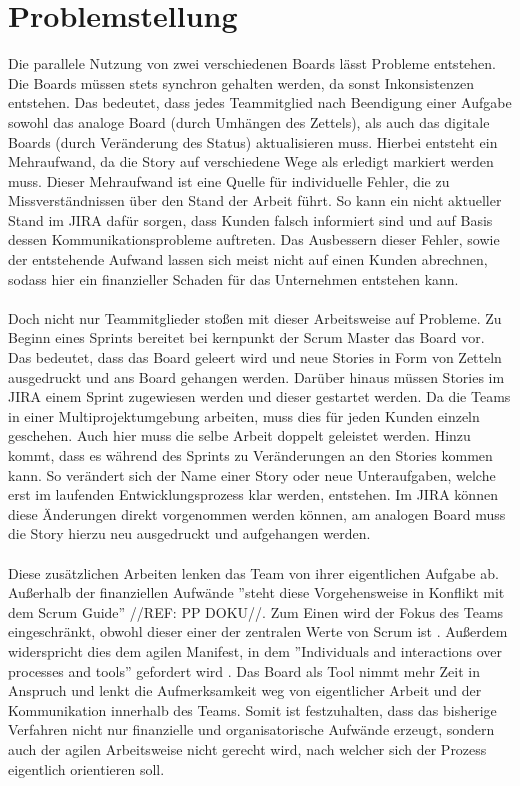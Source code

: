 \section{Problemstellung}
\label{sec:problemstellung}
Die parallele Nutzung von zwei verschiedenen Boards lässt Probleme entstehen. Die Boards müssen stets synchron gehalten werden, da sonst Inkonsistenzen entstehen. Das bedeutet, dass jedes Teammitglied nach Beendigung einer Aufgabe sowohl das analoge Board (durch Umhängen des Zettels), als auch das digitale Boards (durch Veränderung des Status) aktualisieren muss. Hierbei entsteht ein Mehraufwand, da die Story auf verschiedene Wege als erledigt markiert werden muss. Dieser Mehraufwand ist eine Quelle für individuelle Fehler, die zu Missverständnissen über den Stand der Arbeit führt. So kann ein nicht aktueller Stand im JIRA dafür sorgen, dass Kunden falsch informiert sind und auf Basis dessen Kommunikationsprobleme auftreten. Das Ausbessern dieser Fehler, sowie der entstehende Aufwand lassen sich meist nicht auf einen Kunden abrechnen, sodass hier ein finanzieller Schaden für das Unternehmen entstehen kann. \\
\\
Doch nicht nur Teammitglieder stoßen mit dieser Arbeitsweise auf Probleme. Zu Beginn eines Sprints bereitet bei kernpunkt der Scrum Master das Board vor. Das bedeutet, dass das Board geleert wird und neue Stories in Form von Zetteln ausgedruckt und ans Board gehangen werden. Darüber hinaus müssen Stories im JIRA einem Sprint zugewiesen werden und dieser gestartet werden. Da die Teams in einer Multiprojektumgebung arbeiten, muss dies für jeden Kunden einzeln geschehen. Auch hier muss die selbe Arbeit doppelt geleistet werden. Hinzu kommt, dass es während des Sprints zu Veränderungen an den Stories kommen kann. So verändert sich der Name einer Story oder neue Unteraufgaben, welche erst im laufenden Entwicklungsprozess klar werden, entstehen. Im JIRA können diese Änderungen direkt vorgenommen werden können, am analogen Board muss die Story hierzu neu ausgedruckt und aufgehangen werden. \\
\\
Diese zusätzlichen Arbeiten lenken das Team von ihrer eigentlichen Aufgabe ab. Außerhalb der finanziellen Aufwände ''steht diese Vorgehensweise in Konflikt mit dem Scrum Guide'' //REF: PP DOKU//. Zum Einen wird der Fokus des Teams eingeschränkt, obwohl dieser einer der zentralen Werte von Scrum ist \cite{agiledevelopmentwithscrum}. Außerdem widerspricht dies dem agilen Manifest, in dem ''Individuals and interactions over processes and tools'' gefordert wird \cite{agilemanifesto}. Das Board als Tool nimmt mehr Zeit in Anspruch und lenkt die Aufmerksamkeit weg von eigentlicher Arbeit und der Kommunikation innerhalb des Teams. Somit ist festzuhalten, dass das bisherige Verfahren nicht nur finanzielle und organisatorische Aufwände erzeugt, sondern auch der agilen Arbeitsweise nicht gerecht wird, nach welcher sich der Prozess eigentlich orientieren soll.  




